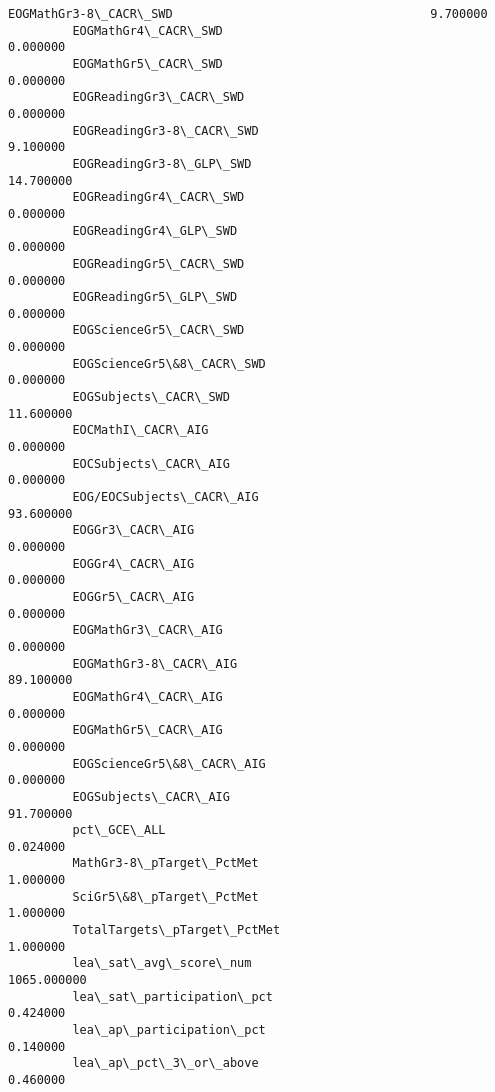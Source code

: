 \documentclass[11pt]{article}
\begin{document}
\begin{Verbatim}[commandchars=\\\{\}]
         EOGMathGr3-8\_CACR\_SWD                                    9.700000   
         EOGMathGr4\_CACR\_SWD                                      0.000000   
         EOGMathGr5\_CACR\_SWD                                      0.000000   
         EOGReadingGr3\_CACR\_SWD                                   0.000000   
         EOGReadingGr3-8\_CACR\_SWD                                 9.100000   
         EOGReadingGr3-8\_GLP\_SWD                                 14.700000   
         EOGReadingGr4\_CACR\_SWD                                   0.000000   
         EOGReadingGr4\_GLP\_SWD                                    0.000000   
         EOGReadingGr5\_CACR\_SWD                                   0.000000   
         EOGReadingGr5\_GLP\_SWD                                    0.000000   
         EOGScienceGr5\_CACR\_SWD                                   0.000000   
         EOGScienceGr5\&8\_CACR\_SWD                                 0.000000   
         EOGSubjects\_CACR\_SWD                                    11.600000   
         EOCMathI\_CACR\_AIG                                        0.000000   
         EOCSubjects\_CACR\_AIG                                     0.000000   
         EOG/EOCSubjects\_CACR\_AIG                                93.600000   
         EOGGr3\_CACR\_AIG                                          0.000000   
         EOGGr4\_CACR\_AIG                                          0.000000   
         EOGGr5\_CACR\_AIG                                          0.000000   
         EOGMathGr3\_CACR\_AIG                                      0.000000   
         EOGMathGr3-8\_CACR\_AIG                                   89.100000   
         EOGMathGr4\_CACR\_AIG                                      0.000000   
         EOGMathGr5\_CACR\_AIG                                      0.000000   
         EOGScienceGr5\&8\_CACR\_AIG                                 0.000000   
         EOGSubjects\_CACR\_AIG                                    91.700000   
         pct\_GCE\_ALL                                              0.024000   
         MathGr3-8\_pTarget\_PctMet                                 1.000000   
         SciGr5\&8\_pTarget\_PctMet                                  1.000000   
         TotalTargets\_pTarget\_PctMet                              1.000000   
         lea\_sat\_avg\_score\_num                                 1065.000000   
         lea\_sat\_participation\_pct                                0.424000   
         lea\_ap\_participation\_pct                                 0.140000   
         lea\_ap\_pct\_3\_or\_above                                    0.460000   

\end{Verbatim}
\end{document}
